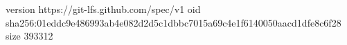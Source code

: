 version https://git-lfs.github.com/spec/v1
oid sha256:01eddc9e486993ab4e082d2d5c1dbbc7015a69c4e1f6140050aacd1dfe8c6f28
size 393312
